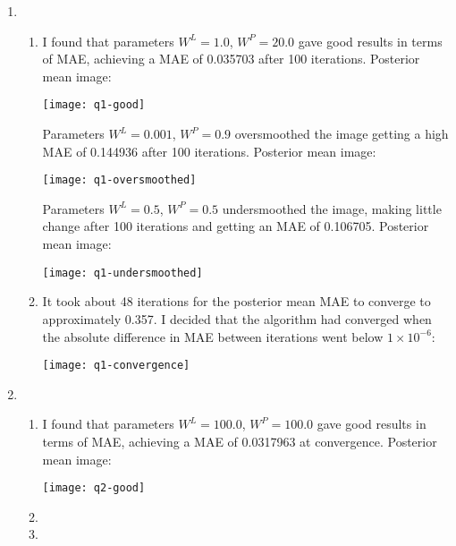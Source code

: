 \documentclass[12pt]{article}
\begin{document}
\begin{enumerate}

\item %
\begin{enumerate}
\item
I found that parameters $W^L=1.0$, $W^P=20.0$ gave good results in terms of MAE, achieving a MAE of 0.035703 after 100 iterations. Posterior mean image:
\begin{center}
\texttt{[image: q1-good]}
\end{center}

Parameters $W^L=0.001$, $W^P=0.9$ oversmoothed the image getting a high MAE of 0.144936 after 100 iterations. Posterior mean image:
\begin{center}
\texttt{[image: q1-oversmoothed]}
\end{center}

Parameters $W^L=0.5$, $W^P=0.5$ undersmoothed the image, making little change after 100 iterations and getting an MAE of 0.106705. Posterior mean image:
\begin{center}
\texttt{[image: q1-undersmoothed]}
\end{center}

\item
It took about 48 iterations for the posterior mean MAE to converge to approximately 0.357. I decided that the algorithm had converged when the absolute difference in MAE between iterations went below $1\times 10^{-6}$:
\begin{center}
\texttt{[image: q1-convergence]}
\end{center}
\end{enumerate}

\item %
\begin{enumerate}
\item
I found that parameters $W^L=100.0$, $W^P=100.0$ gave good results in terms of MAE, achieving a MAE of 0.0317963 at convergence. Posterior mean image:
\begin{center}
\texttt{[image: q2-good]}
\end{center}

\item

\item


\end{enumerate}

\end{enumerate}
\end{document}
